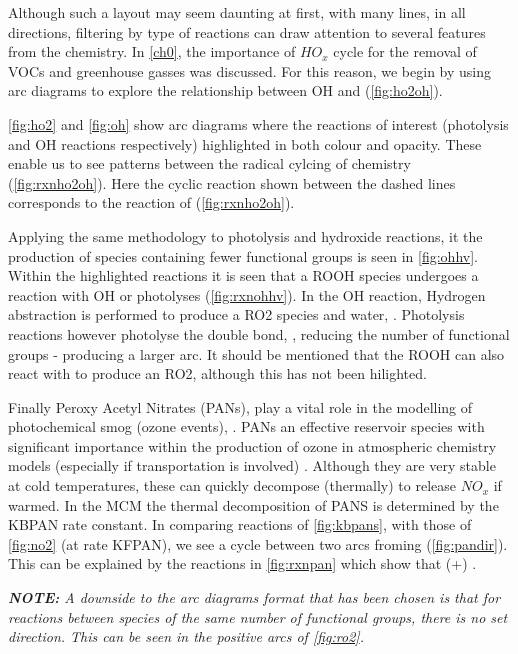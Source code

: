 Although such a layout may seem daunting at first, with many lines, in all directions, filtering by type of reactions can draw attention to several features from the chemistry. In \autoref{ch0}, the importance of $HO_x$ cycle for the removal of VOCs and greenhouse gasses was discussed. For this reason, we begin by using arc diagrams to explore the relationship between OH and  (\autoref{fig:ho2oh}).

\autoref{fig:ho2} and \autoref{fig:oh} show arc diagrams where the reactions of interest (photolysis and OH reactions respectively) highlighted in both colour and opacity. These enable us to see patterns between the radical cylcing of  chemistry (\autoref{fig:rxnho2oh}). Here the cyclic reaction shown between the dashed lines corresponds to the reaction of  (\autoref{fig:rxnho2oh}).

Applying the same methodology to photolysis and hydroxide reactions, it the production of species containing fewer functional groups is seen in \autoref{fig:ohhv}. Within the highlighted reactions it is seen that a ROOH species undergoes a reaction with OH or photolyses (\autoref{fig:rxnohhv}). In the OH reaction, Hydrogen abstraction is performed to produce a RO2 species and water, . Photolysis reactions however photolyse the double bond, , reducing the number of functional groups - producing a larger arc. It should be mentioned that the ROOH can also react with  to produce an RO2, although this has not been hilighted.

Finally Peroxy Acetyl Nitrates (PANs), play a vital role in the modelling of photochemical smog (ozone events), \citep{pans}. PANs an effective reservoir species with significant importance within the production of ozone in atmospheric chemistry models (especially if transportation is involved) \citep{finlayson}. Although they are very stable at cold temperatures, these can quickly decompose (thermally) to release $NO_x$ if warmed. In the MCM the thermal decomposition of PANS is determined by the KBPAN rate constant. In comparing reactions of \autoref{fig:kbpans}, with those of \autoref{fig:no2} (at rate KFPAN), we see a cycle between two arcs froming (\autoref{fig:pandir}). This can be explained by the reactions in \autoref{fig:rxnpan} which show that  (+) .

\textit{\textbf{NOTE:} A downside to the arc diagrams format that has been chosen is that for reactions between species of the same number of functional groups, there is no set direction. This can be seen in the positive arcs of  \autoref{fig:ro2}. }



